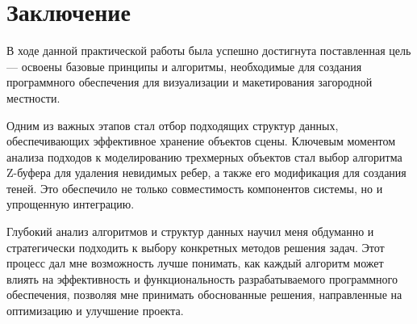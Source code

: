 \chapter*{Заключение}

В ходе данной практической работы была успешно достигнута поставленная цель --- освоены базовые принципы и алгоритмы, необходимые для создания программного обеспечения для визуализации и макетирования загородной местности.

Одним из важных этапов стал отбор подходящих структур данных, обеспечивающих эффективное хранение объектов сцены.  Ключевым моментом анализа подходов к моделированию трехмерных объектов стал выбор алгоритма Z-буфера для удаления невидимых ребер, а также его модификация для создания теней. Это обеспечило не только совместимость компонентов системы, но и упрощенную интеграцию.

Глубокий анализ алгоритмов и структур данных научил меня обдуманно и стратегически подходить к выбору конкретных методов решения задач. Этот процесс дал мне возможность лучше понимать, как каждый алгоритм может влиять на эффективность и функциональность разрабатываемого программного обеспечения, позволяя мне принимать обоснованные решения, направленные на оптимизацию и улучшение проекта.
